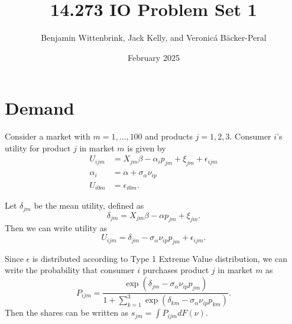 \documentclass{article}
\title{14.273 IO Problem Set 1}
\author{Benjamin Wittenbrink, Jack Kelly, and Veronicá Bäcker-Peral}
\date{February 2025}
\begin{document}
\maketitle

\section{Demand}

Consider a market with $m = 1, \dots, 100$ and products $j = 1, 2, 3$. Consumer $i$'s utility for product $j$ in market $m$ is given by 
\begin{align}
    U_{ijm} &= X_{jm} \beta - \alpha_i p_{jm} + \xi_{jm} + \epsilon_{ijm} \\ 
    \alpha_i &= \alpha + \sigma_\alpha \nu_{ip} \\ 
    U_{i0m} &= \epsilon_{i0m}. 
\end{align}

Let $\delta_{jm}$ be the mean utility, defined as 
\begin{equation}
    \delta_{jm} = X_{jm} \beta - \alpha p_{jm} + \xi_{jm}. 
\end{equation}
Then we can write utility as 
\[
U_{ijm} = \delta_{jm} - \sigma_\alpha \nu_{ip} p_{jm} + \epsilon_{ijm}.
\]

Since $\epsilon$ is distributed according to Type 1 Extreme Value distribution, we can write the probability that consumer $i$ purchases product $j$ in market $m$ as 
\[
    P_{ijm} = \frac{\exp(\delta_{jm} - \sigma_\alpha \nu_{ip} p_{jm})}{
    1 + \sum_{k=1}^3 \exp(\delta_{km} - \sigma_\alpha \nu_{ip} p_{km})
    }.
\]
Then the shares can be written as $s_{jm} = \int P_{ijm} d F(\nu)$. 
\end{document}
